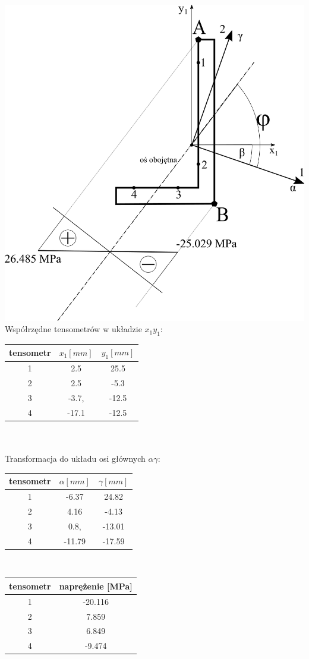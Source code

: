 \documentclass[11pt]{article}
\begin{document}
\includegraphics{wykres.png}\\
Współrzędne tensometrów w układzie $x_1y_1$:\\
\begin{tabular}{c|c|c}
tensometr & $x_1[mm]$ & $y_1[mm]$\\ \hline
1 & 2.5 & 25.5\\
2 & 2.5 & -5.3\\
3 & -3.7, & -12.5\\	
4 & -17.1 & -12.5\\
\end{tabular}\\
\\
Transformacja do układu osi głównych $\alpha\gamma$:\\
\begin{tabular}{c|c|c}
tensometr & $\alpha[mm]$ & $\gamma[mm]$\\ \hline
1 & -6.37 & 24.82\\
2 & 4.16 & -4.13\\
3 & 0.8, & -13.01\\
4 & -11.79 & -17.59\\
\end{tabular}
\\
\begin{tabular}{c|c}
tensometr & naprężenie [MPa]\\ \hline
1 & -20.116\\
2 & 7.859\\
3 & 6.849\\
4 & -9.474\\
\end{tabular}
\end{document}
